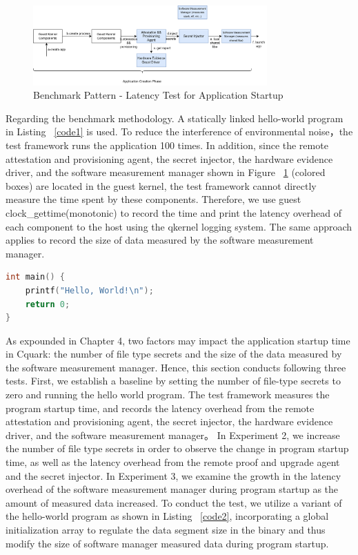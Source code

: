 \begin{figure}[H]
    \centering
    \includegraphics[width=0.8\textwidth]{images/micro_benchmark_app_life_cycle_bencmark_pattern.png}
    \caption[Benchmark Pattern - Latency Test for Application Startup]{Benchmark Pattern - Latency Test for Application Startup}
    \label{fig:micro_benchmark_app_life_cycle_bencmark_pattern}
\end{figure}


Regarding the benchmark methodology. A statically linked hello-world program in Listing ~\ref{code1} is used. To reduce the interference of environmental noise，the test framework runs the application 100 times. In addition, since the remote attestation and provisioning agent, the secret injector, 
the hardware evidence driver, and the software measurement manager shown in Figure  ~\ref{fig:micro_benchmark_app_life_cycle_bencmark_pattern}  (colored boxes) are located in the guest kernel, the test framework cannot directly measure the time spent by these components. Therefore, we use guest clock\_gettime(monotonic) to record the time and print the 
latency overhead of each component to the host using the qkernel logging system. The same approach applies to record the size of data measured by the software measurement manager. 

\begin{lstlisting}[language=C,frame=single,caption=Hello World Program,label=code1]
int main() {
    printf("Hello, World!\n");
    return 0;
}
\end{lstlisting}


As expounded in Chapter 4, two factors may impact the application startup time in Cquark: the number of file type secrets and the size of the data measured by the software measurement manager. Hence, this section conducts following three tests. First, we establish a baseline by setting the 
number of file-type secrets to zero and running the hello world program. The test framework measures the program startup time, and records the latency overhead from the remote attestation and provisioning agent, the secret injector, the hardware evidence driver, and the software measurement manager。  
In Experiment 2, we increase the number of file type secrets in order to observe the change in program startup time, as well as the latency overhead from the remote proof and upgrade agent and the secret injector. In Experiment 3, we examine the growth in the latency overhead of the software 
measurement manager during program startup as the amount of measured data increased. To conduct the test, we utilize a variant of the hello-world program as shown in Listing ~\ref{code2}, incorporating a global initialization array to regulate the data segment size in the binary and thus modify the size 
of software manager measured data during program startup.

